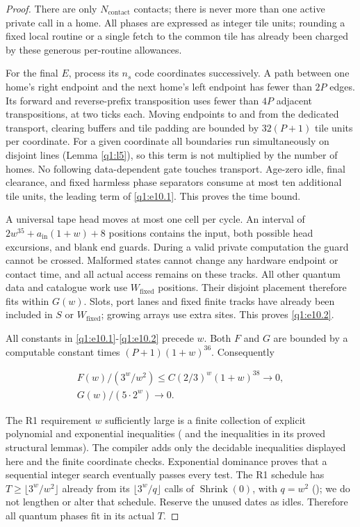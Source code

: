 \begin{proof}
There are only \(N_{\mathrm{contact}}\) contacts; there is never more than one active private call in a home. All phases are expressed as integer tile units; rounding a fixed local routine or a single fetch to the common tile has already been charged by these generous per-routine allowances.

For the final \(E\), process its \(n_{s}\) code coordinates successively. A path between one home's right endpoint and the next home's left endpoint has fewer than \(2P\) edges. Its forward and reverse-prefix transposition uses fewer than \(4P\) adjacent transpositions, at two ticks each. Moving endpoints to and from the dedicated transport, clearing buffers and tile padding are bounded by \(32(P+1)\) tile units per coordinate. For a given coordinate all boundaries run simultaneously on disjoint lines (Lemma \ref{q1:l5}), so this term is not multiplied by the number of homes. No following data-dependent gate touches transport. Age-zero idle, final clearance, and fixed harmless phase separators consume at most ten additional tile units, the leading term of \eqref{q1:e10.1}. This proves the time bound.

A universal tape head moves at most one cell per cycle. An interval of \(2w^{35}+a_{\mathrm{in}}(1+w)+8\) positions contains the input, both possible head excursions, and blank end guards. During a valid private computation the guard cannot be crossed. Malformed states cannot change any hardware endpoint or contact time, and all actual access remains on these tracks. All other quantum data and catalogue work use \(W_{\mathrm{fixed}}\) positions. Their disjoint placement therefore fits within \(G(w)\). Slots, port lanes and fixed finite tracks have already been included in \(S\) or \(W_{\mathrm{fixed}}\); growing arrays use extra sites. This proves \eqref{q1:e10.2}.

All constants in \eqref{q1:e10.1}-\eqref{q1:e10.2} precede \(w\). Both \(F\) and \(G\) are bounded by a computable constant times \((P+1)(1+w)^{36}\). Consequently

\begin{equation}\label{q1:e10.4}
\begin{gathered}
F(w)/(3^{w}/w^{2}) \le  C (2/3)^{w} (1+w)^{38} \to 0, \\ G(w)/(5\cdot 2^{w}) \to 0.
\end{gathered}
\end{equation}

The R1 requirement \(w\) sufficiently large is a finite collection of explicit polynomial and exponential inequalities (\cite[Section~\ref*{cl:sec:construction} and Appendix~\ref*{cl:sec:constants}]{DMNoise1D2026} and the inequalities in its proved structural lemmas). The compiler adds only the decidable inequalities displayed here and the finite coordinate checks. Exponential dominance proves that a sequential integer search eventually passes every test. The R1 schedule has \(T\ge \lfloor 3^{w}/w^{2}\rfloor\) already from its \(\lfloor 3^{w}/q\rfloor\) calls of \(\operatorname{Shrink}(0)\), with \(q=w^2\) (\cite[Section~\ref*{cl:sec:clock}]{DMNoise1D2026}); we do not lengthen or alter that schedule. Reserve the unused dates as idles. Therefore all quantum phases fit in its actual \(T\).


\end{proof}
